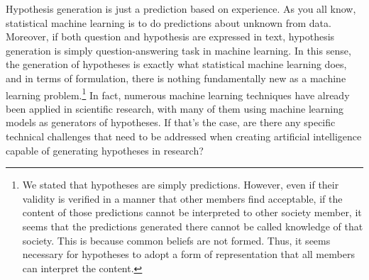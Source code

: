 \documentclass{book}
\begin{document}
Hypothesis generation is just a prediction based on experience. As you all know, statistical machine learning is to do predictions about unknown from data. Moreover, if both question and hypothesis are expressed in text, hypothesis generation is simply question-answering task in machine learning. In this sense, the generation of hypotheses is exactly what statistical machine learning does, and in terms of formulation, there is nothing fundamentally new as a machine learning problem.\footnote{
We stated that hypotheses are simply predictions. However, even if their validity is verified in a manner that other members find acceptable, if the content of those predictions cannot be interpreted to other society member, it seems that the predictions generated there cannot be called knowledge of that society. This is because common beliefs are not formed. Thus, it seems necessary for hypotheses to adopt a form of representation that all members can interpret the content.
} In fact, numerous machine learning techniques have already been applied in scientific research, with many of them using machine learning models as generators of hypotheses. If that's the case, are there any specific technical challenges that need to be addressed when creating artificial intelligence capable of generating hypotheses in research? 



\end{document}
